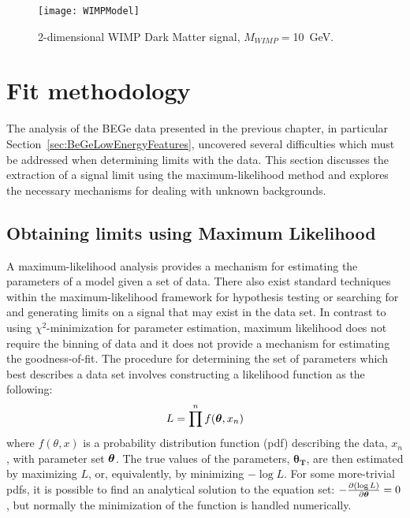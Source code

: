 		\begin{figure}
			\centering
			\texttt{[image: WIMPModel]}
			\caption[2-dimensional WIMP Dark Matter signal]
			{2-dimensional WIMP Dark Matter signal, $M_{WIMP} = $10~GeV.}
			\label{fig:2DDMSignal}
		\end{figure}


\section{Fit methodology} 

	The analysis of the BEGe data presented in the previous chapter, in particular Section~\ref{sec:BeGeLowEnergyFeatures}, uncovered several difficulties which must be addressed when determining limits with the data.  This section discusses the extraction of a signal limit using the maximum-likelihood method and explores the necessary mechanisms for dealing with unknown backgrounds.  
	
	\subsection{Obtaining limits using Maximum Likelihood}
	\label{sec:LimitsML}		

A maximum-likelihood analysis provides a mechanism for estimating the parameters of a model given a set of data.  There also exist standard techniques within the maximum-likelihood framework for hypothesis testing or searching for and generating limits on a signal that may exist in the data set.  In contrast to using $\chi^{2}$-minimization for parameter estimation, maximum likelihood does not require the binning of data
 and it does not provide a mechanism for estimating the goodness-of-fit.  The procedure for determining the set of parameters which best describes a data set involves constructing a likelihood function as the following:
		\[
		L = \prod^{n} f({\boldsymbol{\theta}}, x_{n})
		\]
where $f(\theta, x)$ is a probability distribution function (pdf) describing the data, $x_{n}$, with parameter set $\boldsymbol{\theta}$.  The true values of the parameters, $\boldsymbol{\theta_{T}}$, are then estimated by maximizing $L$, or, equivalently, by minimizing $-\log L$.  For some more-trivial pdfs, it is possible to find an analytical solution to the equation set: $-\frac{\partial ( \log L )}{\partial\boldsymbol{\theta}} = 0$, but normally the minimization of the function is handled numerically.  

